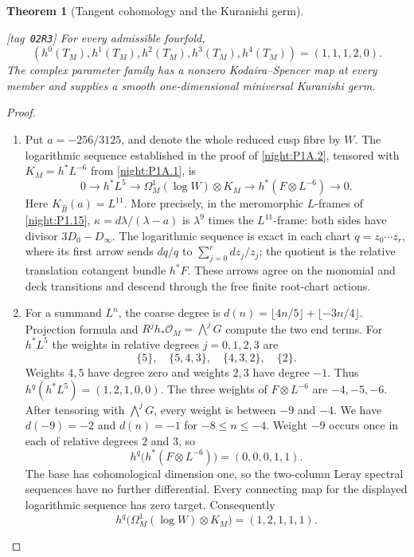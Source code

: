 \documentclass[11pt,a4paper]{article}
\numberwithin{equation}{section}
\newtheorem{theorem}{Theorem}[section]
\theoremstyle{definition}
\newcommand{\StatementRecord}[4]{{\upshape\footnotesize[tag~\texttt{#3}]}\enspace\ignorespaces}
\begin{document}
\begin{theorem}[Tangent cohomology and the Kuranishi germ]\hypertarget{tag-02R3}{}\label{night:P1A.3}
\StatementRecord{night:P1A.3}{proved}{02R3}{\cref{night:P1.9}, \cref{night:P1.10}, \cref{night:P1.15}, \cref{night:P1A.1}, \cref{night:P1A.2}}
For every admissible fourfold,
\[
 (h^0(T_M),h^1(T_M),h^2(T_M),h^3(T_M),h^4(T_M))
 =(1,1,1,2,0).
\]
The complex parameter family has a nonzero Kodaira--Spencer map
at every member and supplies a smooth one-dimensional miniversal
Kuranishi germ.
\end{theorem}
\begin{proof}
\begin{enumerate}[label=\arabic*.]
\item Put $a=-256/3125$, and denote the whole reduced cusp fibre by
$W$.  The logarithmic sequence established in the proof of
\cref{night:P1A.2}, tensored with $K_M=h^*L^{-6}$ from
\cref{night:P1A.1}, is
\[
0\longrightarrow h^*L^5
\longrightarrow\Omega^1_M(\log W)\otimes K_M
\longrightarrow h^*(F\otimes L^{-6})\longrightarrow0.
\]
Here $K_{\widehat B}(a)=L^{11}$.  More precisely, in the meromorphic
$L$-frames of \cref{night:P1.15},
$\kappa=d\lambda/(\lambda-a)$ is $\lambda^9$ times the
$L^{11}$-frame: both sides have divisor $3D_0-D_\infty$.
The logarithmic sequence is exact in each chart
$q=z_0\cdots z_r$, where its first arrow sends $dq/q$ to
$\sum_{j=0}^r dz_j/z_j$; the quotient is the relative translation
cotangent bundle $h^*F$.  These arrows agree on the monomial and deck transitions and descend through the free finite
root-chart actions.

\item For a summand $L^n$, the coarse degree is
$d(n)=\lfloor4n/5\rfloor+\lfloor-3n/4\rfloor$.
Projection formula and
$R^jh_*\mathcal O_M=\bigwedge^jG$ compute the two end terms.
For $h^*L^5$ the weights in relative degrees $j=0,1,2,3$ are
\[
\{5\},\quad\{5,4,3\},\quad\{4,3,2\},\quad\{2\}.
\]
Weights $4,5$ have degree zero and weights $2,3$ have degree $-1$.
Thus $h^q(h^*L^5)=(1,2,1,0,0)$.
The three weights of $F\otimes L^{-6}$ are $-4,-5,-6$.
After tensoring with $\bigwedge^jG$, every weight is between
$-9$ and $-4$.  We have $d(-9)=-2$ and $d(n)=-1$ for
$-8\le n\le-4$.  Weight $-9$ occurs once in each of relative
degrees $2$ and $3$, so
\[
h^q\bigl(h^*(F\otimes L^{-6})\bigr)=(0,0,0,1,1).
\]
The base has cohomological dimension one, so the two-column Leray
spectral sequences have no further differential.  Every connecting
map for the displayed logarithmic sequence has zero target.
Consequently
\[
h^q\bigl(\Omega^1_M(\log W)\otimes K_M\bigr)=(1,2,1,1,1).
\]


\end{enumerate}
\end{proof}
\end{document}
